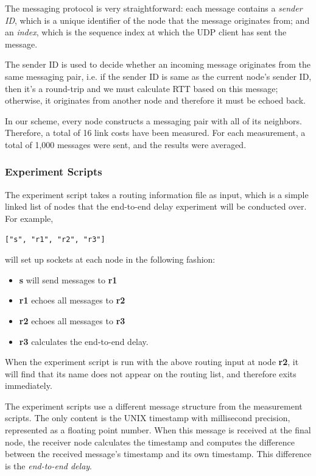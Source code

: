 \documentclass[conference]{IEEEtran}
\begin{document}
The messaging protocol is very straightforward: each message contains a \textit{sender ID}, which is
a unique identifier of the node that the message originates from; and an \textit{index}, which is the
sequence index at which the UDP client has sent the message.

The sender ID is used to decide whether an incoming message originates from the same messaging pair,
i.e. if the sender ID is same as the current node's sender ID, then it's a round-trip and we must
calculate RTT based on this message; otherwise, it originates from another node and therefore it
must be echoed back.

In our scheme, every node constructs a messaging pair with all of its neighbors. Therefore, a total
of 16 link costs have been measured. For each measurement, a total of 1,000 messages were sent,
and the results were averaged.

\subsubsection{Experiment Scripts}
The experiment script takes a routing information file as input, which is a simple linked list of
nodes that the end-to-end delay experiment will be conducted over. For example,

\begin{lstlisting}
["s", "r1", "r2", "r3"]
\end{lstlisting}

will set up sockets at each node in the following fashion:

\begin{itemize}
    \item \textbf{s} will send messages to \textbf{r1}
    \item \textbf{r1} echoes all messages to \textbf{r2}
    \item \textbf{r2} echoes all messages to \textbf{r3}
    \item \textbf{r3} calculates the end-to-end delay.
\end{itemize}

When the experiment script is run with the above routing input at node \textbf{r2}, it will find
that its name does not appear on the routing list, and therefore exits immediately.

The experiment scripts use a different message structure from the measurement scripts. The only
content is the UNIX timestamp with millisecond precision, represented as a floating point number.
When this message is received at the final node, the receiver node calculates the timestamp and
computes the difference between the received message's timestamp and its own timestamp. This
difference is the \textit{end-to-end delay}.
\end{document}
